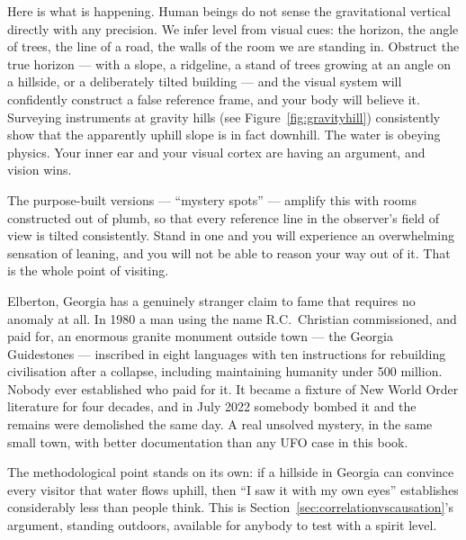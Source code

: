 Here is what is happening. Human beings do not sense the gravitational vertical directly with
any precision. We infer level from visual cues: the horizon, the angle of trees, the line of a
road, the walls of the room we are standing in. Obstruct the true horizon --- with a slope, a
ridgeline, a stand of trees growing at an angle on a hillside, or a deliberately tilted
building --- and the visual system will confidently construct a false reference frame, and
your body will believe it. Surveying instruments at gravity hills (see Figure~\ref{fig:gravityhill}) consistently show that the
apparently uphill slope is in fact downhill. The water is obeying physics. Your inner ear and
your visual cortex are having an argument, and vision wins.

The purpose-built versions --- ``mystery spots'' --- amplify this with rooms constructed out of
plumb, so that every reference line in the observer's field of view is tilted consistently.
Stand in one and you will experience an overwhelming sensation of leaning, and you will not be
able to reason your way out of it. That is the whole point of visiting.

\begin{funfact}
Elberton, Georgia has a genuinely stranger claim to fame that requires no anomaly at all. In
1980 a man using the name R.C.~Christian commissioned, and paid for, an enormous granite
monument outside town --- the Georgia Guidestones --- inscribed in eight languages with ten
instructions for rebuilding civilisation after a collapse, including maintaining humanity under
500 million. Nobody ever established who paid for it. It became a fixture of
New World Order literature for four decades, and in July 2022 somebody bombed it and the
remains were demolished the same day. A real unsolved mystery, in the same small town, with
better documentation than any UFO case in this book.
\end{funfact}

The methodological point stands on its own: if a hillside in Georgia can convince every visitor
that water flows uphill, then ``I saw it with my own eyes'' establishes considerably less than
people think. This is Section~\ref{sec:correlationvscausation}'s argument, standing outdoors, available for anybody to test
with a spirit level.
